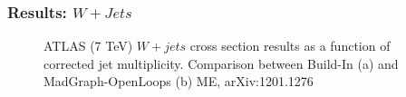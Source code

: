 \documentclass{beamer}
\numberwithin{figure}{section}
\begin{document}
\begin{frame}
 \frametitle{Results: $W+Jets$} 

\begin{figure}[!tbp]
  \centering
  \hfill
  \caption{\scriptsize{ATLAS (7 TeV) $W+jets$ cross section results as a function of corrected jet multiplicity. Comparison between Build-In (a) and MadGraph-OpenLoops (b) ME, arXiv:1201.1276}}
\end{figure}
 

\end{frame}

\end{document}
